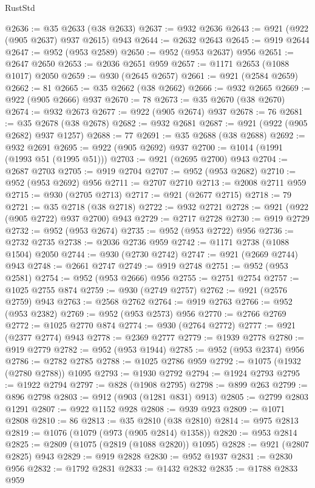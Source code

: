 \begin{lexlean}{RustStd}
\begin{coremodule}
@2636 := @35 @2633 (@38 @2633)
@2637 := @932 @2636
@2643 := @921 (@922 (@905 @2637) @937 @2615) @943
@2644 := @2632 @2643
@2645 := @919 @2644
@2647 := @952 (@953 @2589)
@2650 := @952 (@953 @2637) @956
@2651 := @2647 @2650
@2653 := @2036 @2651 @959
@2657 := @1171 @2653 (@1088 @1017) @2050
@2659 := @930 (@2645 @2657)
@2661 := @921 (@2584 @2659)
@2662 := 81
@2665 := @35 @2662 (@38 @2662)
@2666 := @932 @2665
@2669 := @922 (@905 @2666) @937
@2670 := 78
@2673 := @35 @2670 (@38 @2670)
@2674 := @932 @2673
@2677 := @922 (@905 @2674) @937
@2678 := 76
@2681 := @35 @2678 (@38 @2678)
@2682 := @932 @2681
@2687 := @921 (@922 (@905 @2682) @937 @1257)
@2688 := 77
@2691 := @35 @2688 (@38 @2688)
@2692 := @932 @2691
@2695 := @922 (@905 @2692) @937
@2700 := @1014 (@1991 (@1993 @51 (@1995 @51)))
@2703 := @921 (@2695 @2700) @943
@2704 := @2687 @2703
@2705 := @919 @2704
@2707 := @952 (@953 @2682)
@2710 := @952 (@953 @2692) @956
@2711 := @2707 @2710
@2713 := @2008 @2711 @959
@2715 := @930 (@2705 @2713)
@2717 := @921 (@2677 @2715)
@2718 := 79
@2721 := @35 @2718 (@38 @2718)
@2722 := @932 @2721
@2728 := @921 (@922 (@905 @2722) @937 @2700) @943
@2729 := @2717 @2728
@2730 := @919 @2729
@2732 := @952 (@953 @2674)
@2735 := @952 (@953 @2722) @956
@2736 := @2732 @2735
@2738 := @2036 @2736 @959
@2742 := @1171 @2738 (@1088 @1504) @2050
@2744 := @930 (@2730 @2742)
@2747 := @921 (@2669 @2744) @943
@2748 := @2661 @2747
@2749 := @919 @2748
@2751 := @952 (@953 @2581)
@2754 := @952 (@953 @2666) @956
@2755 := @2751 @2754
@2757 := @1025 @2755 @874
@2759 := @930 (@2749 @2757)
@2762 := @921 (@2576 @2759) @943
@2763 := @2568 @2762
@2764 := @919 @2763
@2766 := @952 (@953 @2382)
@2769 := @952 (@953 @2573) @956
@2770 := @2766 @2769
@2772 := @1025 @2770 @874
@2774 := @930 (@2764 @2772)
@2777 := @921 (@2377 @2774) @943
@2778 := @2369 @2777
@2779 := @1939 @2778
@2780 := @919 @2779
@2782 := @952 (@953 @1944)
@2785 := @952 (@953 @2374) @956
@2786 := @2782 @2785
@2788 := @1025 @2786 @959
@2792 := @1075 (@1932 (@2780 @2788)) @1095
@2793 := @1930 @2792
@2794 := @1924 @2793
@2795 := @1922 @2794
@2797 := @828 (@1908 @2795)
@2798 := @899 @263
@2799 := @896 @2798
@2803 := @912 (@903 (@1281 @831) @913)
@2805 := @2799 @2803 @1291
@2807 := @922 @1152 @928
@2808 := @939 @923
@2809 := @1071 @2808
@2810 := 86
@2813 := @35 @2810 (@38 @2810)
@2814 := @975 @2813
@2819 := @1076 (@1079 (@973 (@905 @2814) @1358))
@2820 := @953 @2814
@2825 := @2809 (@1075 (@2819 (@1088 @2820)) @1095)
@2828 := @921 (@2807 @2825) @943
@2829 := @919 @2828
@2830 := @952 @1937
@2831 := @2830 @956
@2832 := @1792 @2831
@2833 := @1432 @2832
@2835 := @1788 @2833 @959

\end{coremodule}
\end{lexlean}
